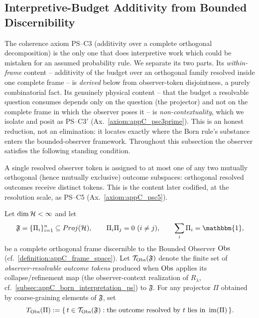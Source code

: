 \subsection{Interpretive-Budget Additivity from Bounded Discernibility}
\label{subsec:appC_born_additivity_derivation}
The coherence axiom PS--C3 (additivity over a complete orthogonal decomposition) is
the only one that does interpretive work which could be mistaken for an assumed
probability rule. We separate its two parts. Its \emph{within-frame} content --
additivity of the budget over an orthogonal family resolved inside one complete
frame -- is \emph{derived} below from observer-token disjointness, a purely
combinatorial fact. Its genuinely physical content -- that the budget a resolvable
question consumes depends only on the question (the projector) and not on the
complete frame in which the observer poses it -- is \emph{non-contextuality}, which
we isolate and posit as PS--C3$'$ (Ax.~\ref{axiom:appC_psc3prime}). This is an honest
reduction, not an elimination: it locates exactly where the Born rule's substance
enters the bounded-observer framework. Throughout this subsection the observer
satisfies the following standing condition.

\begin{assumption}
\label{assumption:appC_bounded_discernibility}
A single resolved observer token is assigned to at most one of any two mutually
orthogonal (hence mutually exclusive) outcome subspaces: orthogonal resolved outcomes
receive distinct tokens. This is the content later codified, at the resolution scale,
as PS--C5 (Ax.~\ref{axiom:appC_psc5}).
\end{assumption}

\begin{definition}
\label{definition:appC_observer_token_space}
Let $\dim\mathcal{H} < \infty$ and let
\[
\mathfrak{F} = \{\Pi_i\}_{i=1}^{n} \subseteq Proj(\Horizon),
\qquad \Pi_i \Pi_j = 0\ (i \neq j),\qquad \sum_i \Pi_i = \mathbbm{1},
\]
be a complete orthogonal frame discernible to the Bounded Observer $\mathrm{Obs}$
(cf.~\ref{definition:appC_frame_space}). Let $\mathcal{T}_{\mathrm{Obs}}(\mathfrak{F})$ denote
the finite set of \emph{observer-resolvable outcome tokens} produced when $\mathrm{Obs}$
applies its collapse/refinement map (the observer-context realization of $R_\lambda$,
cf.~\ref{subsec:appC_born_interpretation_ps}) to $\mathfrak{F}$. For any projector
$\Pi$ obtained by coarse-graining elements of $\mathfrak{F}$, set
\[
T_{\mathrm{Obs}}(\Pi) := \{\, t \in \mathcal{T}_{\mathrm{Obs}}(\mathfrak{F}) :
\text{the outcome resolved by } t \text{ lies in } \operatorname{im}(\Pi) \,\}.
\]
\end{definition}

